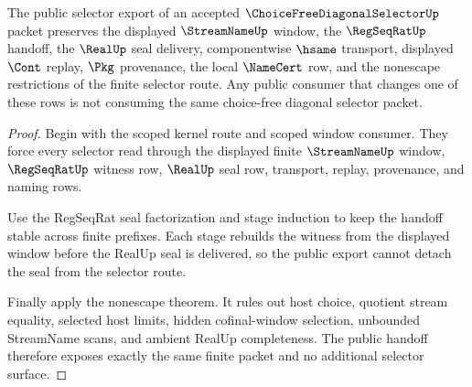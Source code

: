 \begin{theorem}
\label{thm:choice-free-diagonal-selector-public-handoff}
The public selector export of an accepted $\ChoiceFreeDiagonalSelectorUp$ packet preserves the displayed $\StreamNameUp$ window, the $\RegSeqRatUp$ handoff, the $\RealUp$ seal delivery, componentwise $\hsame$ transport, displayed $\Cont$ replay, $\Pkg$ provenance, the local $\NameCert$ row, and the nonescape restrictions of the finite selector route. Any public consumer that changes one of these rows is not consuming the same choice-free diagonal selector packet.
\end{theorem}
\begin{proof}
Begin with the scoped kernel route and scoped window consumer. They force every selector read through the displayed finite $\StreamNameUp$ window, $\RegSeqRatUp$ witness row, $\RealUp$ seal row, transport, replay, provenance, and naming rows.

Use the RegSeqRat seal factorization and stage induction to keep the handoff stable across finite prefixes. Each stage rebuilds the witness from the displayed window before the RealUp seal is delivered, so the public export cannot detach the seal from the selector route.

Finally apply the nonescape theorem. It rules out host choice, quotient stream equality, selected host limits, hidden cofinal-window selection, unbounded StreamName scans, and ambient RealUp completeness. The public handoff therefore exposes exactly the same finite packet and no additional selector surface.
\end{proof}


